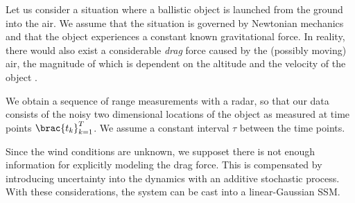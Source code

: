 \begin{example}
\label{ex:ballistic}
Let us consider a situation where a ballistic object is launched
from the ground into the air. We assume that the situation is governed by Newtonian
mechanics and that the object experiences a constant known gravitational
force. In reality, there would also exist a considerable \emph{drag} force
caused by the (possibly moving) air, the magnitude of which is dependent
on the altitude and the velocity of the object \parencite{ristic2004beyond}. 

We obtain a sequence of range measurements with a radar,
so that our data consists of the noisy two dimensional locations 
of the object as measured at time points $\brac{t_k}_{k=1}^T$.
We assume a constant interval $\tau$ between the time points.

Since the wind conditions are unknown, we supposet there is not
enough information for explicitly modeling the drag force. 
This is compensated by introducing
uncertainty into the dynamics with an additive stochastic process.
With these considerations, the system can be cast into a linear-Gaussian
SSM. 



\end{example}
